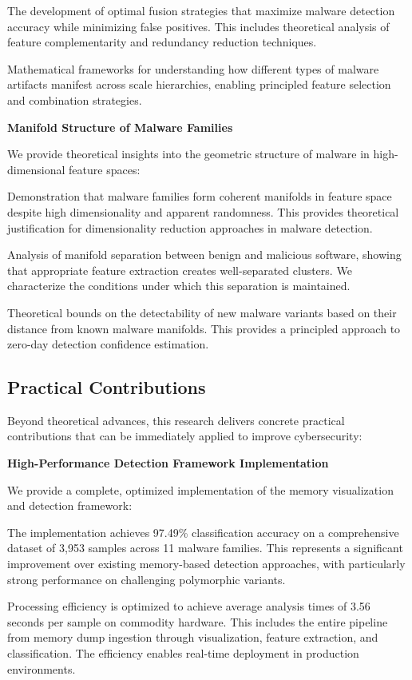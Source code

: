 The development of optimal fusion strategies that maximize malware detection accuracy while minimizing false positives. This includes theoretical analysis of feature complementarity and redundancy reduction techniques.

Mathematical frameworks for understanding how different types of malware artifacts manifest across scale hierarchies, enabling principled feature selection and combination strategies.

\textbf{Manifold Structure of Malware Families}

We provide theoretical insights into the geometric structure of malware in high-dimensional feature spaces:

Demonstration that malware families form coherent manifolds in feature space despite high dimensionality and apparent randomness. This provides theoretical justification for dimensionality reduction approaches in malware detection.

Analysis of manifold separation between benign and malicious software, showing that appropriate feature extraction creates well-separated clusters. We characterize the conditions under which this separation is maintained.

Theoretical bounds on the detectability of new malware variants based on their distance from known malware manifolds. This provides a principled approach to zero-day detection confidence estimation.

\subsection{Practical Contributions}
\label{subsec:practical_contributions}

Beyond theoretical advances, this research delivers concrete practical contributions that can be immediately applied to improve cybersecurity:

\textbf{High-Performance Detection Framework Implementation}

We provide a complete, optimized implementation of the memory visualization and detection framework:

The implementation achieves 97.49\% classification accuracy on a comprehensive dataset of 3,953 samples across 11 malware families. This represents a significant improvement over existing memory-based detection approaches, with particularly strong performance on challenging polymorphic variants.

Processing efficiency is optimized to achieve average analysis times of 3.56 seconds per sample on commodity hardware. This includes the entire pipeline from memory dump ingestion through visualization, feature extraction, and classification. The efficiency enables real-time deployment in production environments.

